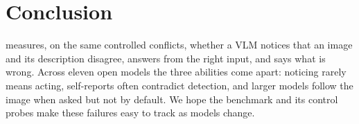 \section{Conclusion}
\label{sec:conclusion}
\name measures, on the same controlled conflicts, whether a VLM notices that an image and its description disagree, answers from the right input, and says what is wrong. Across eleven open models the three abilities come apart: noticing rarely means acting, self-reports often contradict detection, and larger models follow the image when asked but not by default. We hope the benchmark and its control probes make these failures easy to track as models change.
